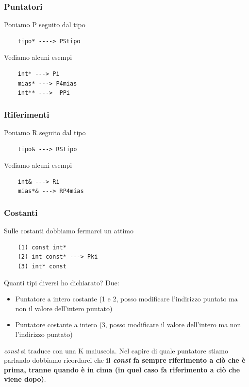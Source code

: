 \subsubsection{Puntatori}
Poniamo P seguito dal tipo
\begin{verbatim}
	tipo* ----> PStipo
\end{verbatim}
Vediamo alcuni esempi
\begin{verbatim}
	int* ---> Pi
	mias* ---> P4mias
	int** --->  PPi
\end{verbatim}
\subsubsection{Riferimenti}
Poniamo R seguito dal tipo 
\begin{verbatim}
	tipo& ---> RStipo
\end{verbatim}
Vediamo alcuni esempi
\begin{verbatim}
	int& ---> Ri
	mias*& ---> RP4mias
\end{verbatim}
\subsubsection{Costanti}
Sulle costanti dobbiamo fermarci un attimo
\begin{verbatim}
	(1) const int*
	(2) int const* ---> Pki
	(3) int* const 
\end{verbatim}
Quanti tipi diversi ho dichiarato? Due:
\begin{itemize}
	\item Puntatore a intero costante (1 e 2, posso modificare l'indirizzo puntato ma non il valore dell'intero puntato)
	\item Puntatore costante a intero (3, posso modificare il valore dell'intero ma non l'indirizzo puntato)
\end{itemize}
\emph{const} si traduce con una K maiuscola. Nel capire di quale puntatore stiamo parlando dobbiamo ricordarci che \textbf{il \emph{const} fa sempre riferimento a ciò che è prima, tranne quando è in cima (in quel caso fa riferimento a ciò che viene dopo)}.
